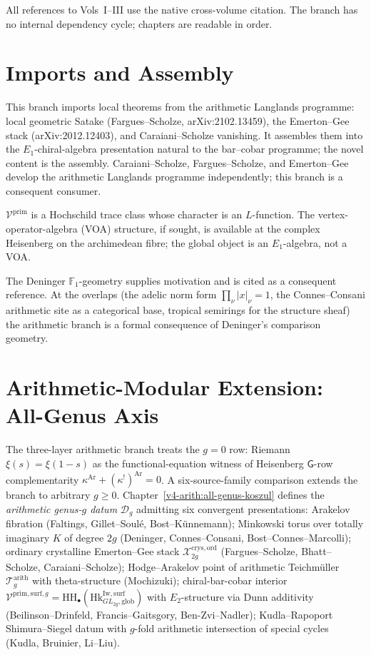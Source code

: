 All references to Vols~I--III use the native cross-volume citation.
The branch has no internal dependency cycle; chapters are readable in
order.

\section{Imports and Assembly}
\label{v4-arith:manifesto:out-of-domain}

This branch imports local theorems from the arithmetic Langlands
programme: local geometric Satake (Fargues--Scholze,
arXiv:2102.13459), the Emerton--Gee stack
(arXiv:2012.12403), and Caraiani--Scholze vanishing.
It assembles them into the \(E_{1}\)-chiral-algebra presentation
natural to the bar--cobar programme; the novel content is the
assembly. Caraiani--Scholze, Fargues--Scholze, and Emerton--Gee
develop the arithmetic Langlands programme independently; this
branch is a consequent consumer.

\(\mathcal{V}^{\mathrm{prim}}\) is a Hochschild trace class whose
character is an \(L\)-function. The vertex-operator-algebra (VOA)
structure, if sought, is available at the complex Heisenberg on
the archimedean fibre; the global object is an \(E_1\)-algebra,
not a VOA.

The Deninger \(\mathbb{F}_{1}\)-geometry supplies
motivation and is cited as a consequent reference. At the overlaps
(the adelic norm form \(\prod_{\nu}|x|_{\nu}=1\), the
Connes--Consani arithmetic site as a categorical base, tropical
semirings for the structure sheaf) the arithmetic branch is a formal
consequence of Deninger's comparison geometry.

\section{Arithmetic-Modular Extension: All-Genus Axis}
\label{v4-arith:manifesto:all-genus}

The three-layer arithmetic branch treats the
\(g=0\) row: Riemann \(\xi(s)=\xi(1-s)\) as the functional-equation
witness of Heisenberg \(\mathsf{G}\)-row complementarity
\(\kappa^{\mathrm{Ar}}+(\kappa^{!})^{\mathrm{Ar}}=0\). A six-source-family
comparison extends the branch to arbitrary \(g\geq 0\). Chapter~\ref{v4-arith:all-genus-koszul}
defines the \emph{arithmetic genus-\(g\) datum} \(\mathcal{D}_g\) admitting
six convergent presentations: Arakelov fibration (Faltings, Gillet--Soulé,
Bost--Künnemann); Minkowski torus over totally imaginary \(K\) of
degree \(2g\) (Deninger, Connes--Consani, Bost--Connes--Marcolli); ordinary
crystalline Emerton--Gee stack \(\mathcal{X}_{2g}^{\mathrm{crys,ord}}\)
(Fargues--Scholze, Bhatt--Scholze, Caraiani--Scholze); Hodge--Arakelov
point of arithmetic Teichmüller \(\mathcal{T}_g^{\mathrm{arith}}\) with
theta-structure (Mochizuki); chiral-bar-cobar interior
\(\mathcal{V}^{\mathrm{prim,surf},g}=\mathrm{HH}_\bullet(\mathrm{Hk}^{\mathrm{Iw,surf}}_{GL_{2g},\mathrm{glob}})\)
with \(E_2\)-structure via Dunn additivity (Beilinson--Drinfeld,
Francis--Gaitsgory, Ben-Zvi--Nadler); Kudla--Rapoport Shimura--Siegel
datum with \(g\)-fold arithmetic intersection of special cycles
(Kudla, Bruinier, Li--Liu).

